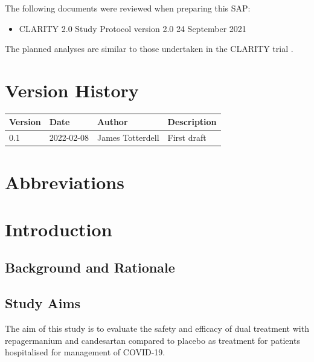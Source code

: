 \documentclass[11pt,parskip=half-]{scrartcl}
\begin{document}
The following documents were reviewed when preparing this SAP:
\begin{itemize}
    \item CLARITY 2.0 Study Protocol version 2.0 24 September 2021
\end{itemize}

The planned analyses are similar to those undertaken in the CLARITY trial \cite{hockham2021protocol, mcgree2021controlled}.

\section*{Version History}

\begin{table}[H]
    \begin{center}
        \begin{tabular}{lllp{5cm}}
            \hline
            Version & Date       & Author           & Description \\
            \hline
            0.1     & 2022-02-08 & James Totterdell & First draft \\
            \hline
        \end{tabular}
    \end{center}
\end{table}

\section*{Abbreviations}

\clearpage

\section{Introduction}

\subsection{Background and Rationale}

\subsection{Study Aims}
The aim of this study is to evaluate the safety and efficacy of dual treatment with repagermanium and candesartan compared to placebo as treatment for patients hospitalised for management of COVID-19.

\clearpage
\end{document}
